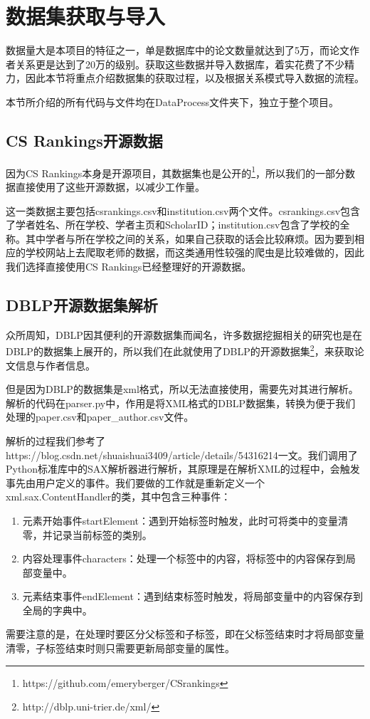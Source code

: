 
\section{数据集获取与导入}

数据量大是本项目的特征之一，单是数据库中的论文数量就达到了5万，而论文作者关系更是达到了20万的级别。获取这些数据并导入数据库，着实花费了不少精力，因此本节将重点介绍数据集的获取过程，以及根据关系模式导入数据的流程。

本节所介绍的所有代码与文件均在DataProcess文件夹下，独立于整个项目。

\subsection{CS Rankings开源数据}

因为CS Rankings本身是开源项目，其数据集也是公开的\footnote{https://github.com/emeryberger/CSrankings}，所以我们的一部分数据直接使用了这些开源数据，以减少工作量。

这一类数据主要包括csrankings.csv和institution.csv两个文件。csrankings.csv包含了学者姓名、所在学校、学者主页和ScholarID；institution.csv包含了学校的全称。其中学者与所在学校之间的关系，如果自己获取的话会比较麻烦。因为要到相应的学校网站上去爬取老师的数据，而这类通用性较强的爬虫是比较难做的，因此我们选择直接使用CS Rankings已经整理好的开源数据。

\subsection{DBLP开源数据集解析}

众所周知，DBLP因其便利的开源数据集而闻名，许多数据挖掘相关的研究也是在DBLP的数据集上展开的，所以我们在此就使用了DBLP的开源数据集\footnote{http://dblp.uni-trier.de/xml/}，来获取论文信息与作者信息。

但是因为DBLP的数据集是xml格式，所以无法直接使用，需要先对其进行解析。解析的代码在parser.py中，作用是将XML格式的DBLP数据集，转换为便于我们处理的paper.csv和paper\_author.csv文件。

解析的过程我们参考了https://blog.csdn.net/shuaishuai3409/article/details/54316214一文。我们调用了Python标准库中的SAX解析器进行解析，其原理是在解析XML的过程中，会触发事先由用户定义的事件。我们要做的工作就是重新定义一个xml.sax.ContentHandler的类，其中包含三种事件：
\begin{enumerate}
\item 元素开始事件startElement：遇到开始标签时触发，此时可将类中的变量清零，并记录当前标签的类别。
\item 内容处理事件characters：处理一个标签中的内容，将标签中的内容保存到局部变量中。
\item 元素结束事件endElement：遇到结束标签时触发，将局部变量中的内容保存到全局的字典中。
\end{enumerate}
需要注意的是，在处理时要区分父标签和子标签，即在父标签结束时才将局部变量清零，子标签结束时则只需要更新局部变量的属性。

